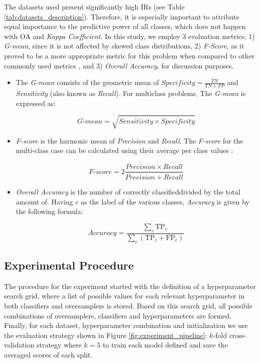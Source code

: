 \documentclass[remotesensing,article,submit,moreauthors,pdftex]{Definitions/mdpi}
\begin{document}
\begin{paracol}{2}
The datasets used present significantly high IRs (see Table
\ref{tab:datasets_description}). Therefore, it is especially important to
attribute equal importance to the predictive power of all classes, which does
not happen with OA and \textit{Kappa Coefficient}. In this study, we employ 3
evaluation metrics: 1) \textit{G-mean}, since it is not affected by skewed class
distributions, 2) \textit{F-Score}, as it proved to be a more appropriate metric
for this problem when compared to other commonly used metrics \cite{Jeni2013},
and 3) \textit{Overall Accuracy}, for discussion purposes.

\begin{itemize}
	\item The \textit{G-mean} consists of the geometric mean of
	      $Specificity = \frac{TN}{TN + FP}$ and \textit{Sensitivity} (also known as \textit{Recall}). For multiclass problems, The
	      \textit{G-mean} is expressed as:

	      $$\textit{G-mean} = \sqrt{ \overline{Sensitivity} \times
			      \overline{Specificity}}$$

	\item \textit{F-score} is the harmonic mean of \textit{Precision} and
	      \textit{Recall}. The \textit{F-score} for the multi-class case can
	      be calculated using their average per class values \cite{He2009}:

	      $$\textit{F-score}=2\frac{\overline{Precision} \times \overline{Recall}}{\overline{Precision} +
			      \overline{Recall}}$$

    \item \textit{Overall Accuracy} is the number of correctly
        classifieddivided by the total
        amount of. Having \( c
        \) as the label of the various classes, \textit{Accuracy} is given by
        the following formula:

	      $$\textit{Accuracy} = \frac{ \sum\limits_{c}{ \text{TP}_{c} } }{
			      \sum\limits_{c}{ (\text{TP}_{c}  + \text{FP}_{c}) } } $$

\end{itemize}

\subsection{Experimental Procedure}

The procedure for the experiment started with the definition of a
hyperparameter search grid, where a list of possible values for each relevant
hyperparameter in both classifiers and oversamplers is stored. Based on this
search grid, all possible combinations of oversamplers, classifiers and
hyperparameters are formed.  Finally, for each dataset, hyperparameter
combination and initialization we use the evaluation strategy shown in Figure
\ref{fig:experiment_pipeline}: $k$-fold cross-validation strategy where $k=5$
to train each model defined and save the averaged scores of each split.


\end{paracol}
\end{document}

